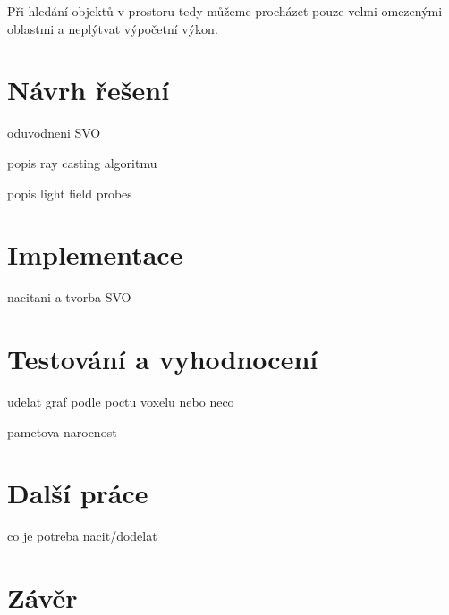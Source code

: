 Při hledání objektů v prostoru tedy můžeme procházet pouze velmi omezenými oblastmi a neplýtvat výpočetní výkon. 

\chapter{Návrh řešení}
\label{navrh}
oduvodneni SVO

popis ray casting algoritmu

popis light field probes

\chapter{Implementace}
\label{implementace}
nacitani a tvorba SVO


\chapter{Testování a vyhodnocení}
\label{testovani}
udelat graf podle poctu voxelu nebo neco

pametova narocnost

\chapter{Další práce}
\label{dalsi_prace}
co je potreba nacit/dodelat


\chapter{Závěr}
\label{zaver}




